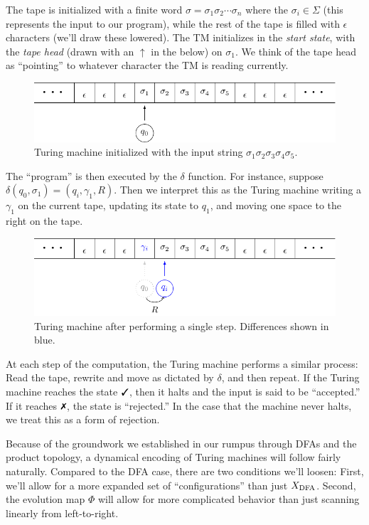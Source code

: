 \documentclass{fkpaper}
\begin{document}
\begin{multicols}{2}
The tape is initialized with a finite word $\sigma = \sigma_1 \sigma_2
\cdots \sigma_n$ where the $\sigma_i \in \Sigma$ (this represents the
input to our program), while the rest of the tape is filled with
$\epsilon$ characters (we'll draw these lowered). The TM initializes
in the \emph{start state}, with the \emph{tape head} (drawn with an
$\uparrow$ in the below) on $\sigma_1$. We think of the tape head as
``pointing'' to whatever character the TM is reading currently.
\begin{figure}[H]
  \centering
  \includegraphics[scale=.7]{figures/tm-initial-input.pdf}
  \caption{Turing machine initialized with the input string $\sigma_1
    \sigma_2 \sigma_3 \sigma_4 \sigma_5$.}
\end{figure}
The ``program'' is then executed by the $\delta$ function. For
instance, suppose $\delta(q_0, \sigma_1) = (q_i, \gamma_1, R)$. Then
we interpret this as the Turing machine writing a $\gamma_1$ on the
current tape, updating its state to $q_1$, and moving one space to the
right on the tape.
\begin{figure}[H]
  \centering
  \includegraphics[scale=.7]{figures/tm-one-step-later.pdf}
  \caption{Turing machine after performing a single step. Differences
    shown in {\color{blue} blue}.}
\end{figure}
At each step of the computation, the Turing machine performs a similar
process: Read the tape, rewrite and move as dictated by $\delta$, and
then repeat. If the Turing machine reaches the state $\cmark$, then it
halts and the input is said to be ``accepted.'' If it reaches
$\xmark$, the state is ``rejected.'' In the case that the machine
never halts, we treat this as a form of rejection.




Because of the groundwork we established in our rumpus through DFAs
and the product topology, a dynamical encoding of Turing machines will
follow fairly naturally. Compared to the DFA case, there are two
conditions we'll loosen: First, we'll allow for a more expanded set of
``configurations'' than just $X_{\rm DFA}$. Second, the evolution map
$\Phi$ will allow for more complicated behavior than just scanning
linearly from left-to-right.


\end{multicols}
\end{document}
